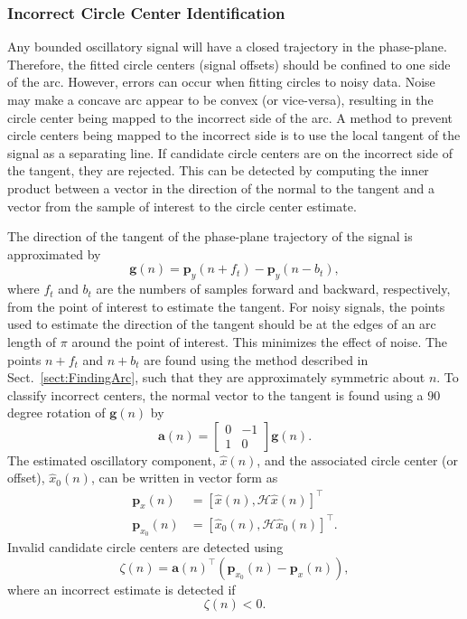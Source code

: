 \documentclass[a4paper]{IEEEtran}
\begin{document}
\subsubsection{Incorrect Circle Center Identification}
Any bounded oscillatory signal will have a closed trajectory in the phase-plane. Therefore, the fitted circle centers (signal offsets) should be confined to one side of the arc. However, errors can occur when fitting circles to noisy data. Noise may make a concave arc appear to be convex (or vice-versa), resulting in the circle center being mapped to the incorrect side of the arc. A method to prevent circle centers being mapped to the incorrect side is to use the local tangent of the signal as a separating line. If candidate circle centers are on the incorrect side of the tangent, they are rejected. This can be detected by computing the inner product between a vector in the direction of the normal to the tangent and a vector from the sample of interest to the circle center estimate. 

The direction of the tangent of the phase-plane trajectory of the signal is approximated by 
\begin{equation}
	\mathbf{g}(n) = \mathbf{p}_y(n + f_t) - \mathbf{p}_y(n - b_t),
\end{equation}
where $f_t$ and $b_t$ are the numbers of samples forward and backward, respectively, from the point of interest to estimate the tangent. For noisy signals, the points used to estimate the direction of the tangent should be at the edges of an arc length of $\pi$ around the point of interest. This minimizes the effect of noise. The points $n+f_t$ and $n+b_t$ are found using the method described in Sect.~\ref{sect:FindingArc}, such that they are approximately symmetric about $n$. To classify incorrect centers, the normal vector to the tangent is found using a $90$ degree rotation of $\mathbf{g}(n)$ by
\begin{equation}
	\mathbf{a}\left(n\right) = \left[\begin{array}{cc}
	0 & -1 \\
	1 & 0\end{array}\right]\mathbf{g}(n).
\end{equation}
The estimated oscillatory component, $\hat{x}(n)$, and the associated circle center (or offset), $\hat{x}_0(n)$, can be written in vector form as
\begin{align}
	\mathbf{p}_x(n) &= \left[\hat{x}\left(n\right),\mathcal{H}\hat{x}\left(n\right)\right]^{\top} \\ 
	\mathbf{p}_{x_0}\left(n\right) &= \left[\hat{x}_0\left(n\right), \mathcal{H}\hat{x}_0\left(n\right)\right]^{\top}. 
\end{align}
Invalid candidate circle centers are detected using 
\begin{equation}
    \zeta(n) = \mathbf{a}\left( n\right)^{\top}\left( \mathbf{p}_{x_0}\left( n \right) - \mathbf{p}_x\left( n\right) \right),
\end{equation}
where an incorrect estimate is detected if
\begin{equation}\label{eq:IncorrectSideClassifier}
    \zeta(n) < 0.
\end{equation} 
\end{document}
